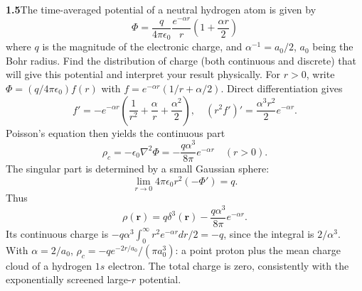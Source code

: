 \par\bigskip
\noindent\textbf{1.5}\quad The time-averaged potential of a neutral hydrogen atom is given by
\[
\Phi = \frac{q}{4\pi\epsilon_{0}}\frac{e^{-\alpha r}}{r}\left(1+\frac{\alpha r}{2}\right)
\]
where $q$ is the magnitude of the electronic charge, and $\alpha^{-1}=a_{0}/2$, $a_{0}$ being the Bohr radius. Find the distribution of charge (both continuous and discrete) that will give this potential and interpret your result physically.
\solution
For $r>0$, write $\Phi=(q/4\pi\epsilon_0)f(r)$ with
$f=e^{-\alpha r}(1/r+\alpha/2)$. Direct differentiation gives
\[
f'=-e^{-\alpha r}\left(\frac1{r^2}+\frac\alpha r+\frac{\alpha^2}{2}\right),
\quad
(r^2f')'=\frac{\alpha^3r^2}{2}e^{-\alpha r}.
\]
Poisson's equation then yields the continuous part
\[
\rho_c=-\epsilon_0\nabla^2\Phi
=-\frac{q\alpha^3}{8\pi}e^{-\alpha r}\quad(r>0).
\]
The singular part is determined by a small Gaussian sphere:
\[
\lim_{r\to0}4\pi\epsilon_0r^2(-\Phi')=q.
\]
Thus
\[
\boxed{\rho(\mathbf r)=q\delta^3(\mathbf r)
-\frac{q\alpha^3}{8\pi}e^{-\alpha r}.}
\]
Its continuous charge is
$-q\alpha^3\int_0^\infty r^2e^{-\alpha r}dr/2=-q$, since the integral
is $2/\alpha^3$. With $\alpha=2/a_0$,
$\rho_c=-q e^{-2r/a_0}/(\pi a_0^3)$: a point proton plus the mean charge
cloud of a hydrogen $1s$ electron. The total charge is zero, consistently
with the exponentially screened large-$r$ potential.



